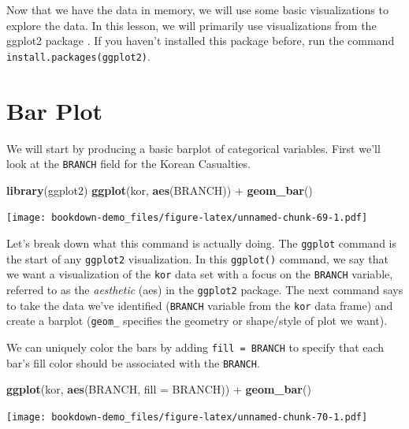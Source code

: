 \documentclass[]{book}
\newenvironment{Shaded}{\begin{snugshade}}{\end{snugshade}}
\newcommand{\KeywordTok}[1]{\textcolor[rgb]{0.13,0.29,0.53}{\textbf{{#1}}}}
\newcommand{\DataTypeTok}[1]{\textcolor[rgb]{0.13,0.29,0.53}{{#1}}}
\newcommand{\StringTok}[1]{\textcolor[rgb]{0.31,0.60,0.02}{{#1}}}
\newcommand{\NormalTok}[1]{{#1}}
\begin{document}
Now that we have the data in memory, we will use some basic
visualizations to explore the data. In this lesson, we will primarily
use visualizations from the ggplot2 package \citep{R-ggplot2}. If you
haven't installed this package before, run the command
\texttt{install.packages(\textquotesingle{}ggplot2\textquotesingle{})}.

\section{Bar Plot}\label{bar-plot}

We will start by producing a basic barplot of categorical variables.
First we'll look at the \texttt{BRANCH} field for the Korean Casualties.

\begin{Shaded}
\begin{Highlighting}[]
\KeywordTok{library}\NormalTok{(ggplot2)}
\KeywordTok{ggplot}\NormalTok{(kor, }\KeywordTok{aes}\NormalTok{(BRANCH)) +}\StringTok{ }\KeywordTok{geom_bar}\NormalTok{()}
\end{Highlighting}
\end{Shaded}

\texttt{[image: bookdown-demo\_files/figure-latex/unnamed-chunk-69-1.pdf]}

Let's break down what this command is actually doing. The
\texttt{ggplot} command is the start of any \texttt{ggplot2}
visualization. In this \texttt{ggplot()} command, we say that we want a
visualization of the \texttt{kor} data set with a focus on the
\texttt{BRANCH} variable, referred to as the \emph{aesthetic} (aes) in
the \texttt{ggplot2} package. The next command says to take the data
we've identified (\texttt{BRANCH} variable from the \texttt{kor} data
frame) and create a barplot (\texttt{geom\_} specifies the geometry or
shape/style of plot we want).

We can uniquely color the bars by adding \texttt{fill\ =\ BRANCH} to
specify that each bar's fill color should be associated with the
\texttt{BRANCH}.

\begin{Shaded}
\begin{Highlighting}[]
\KeywordTok{ggplot}\NormalTok{(kor, }\KeywordTok{aes}\NormalTok{(BRANCH, }\DataTypeTok{fill =} \NormalTok{BRANCH)) +}\StringTok{ }\KeywordTok{geom_bar}\NormalTok{()}
\end{Highlighting}
\end{Shaded}

\texttt{[image: bookdown-demo\_files/figure-latex/unnamed-chunk-70-1.pdf]}
\end{document}
